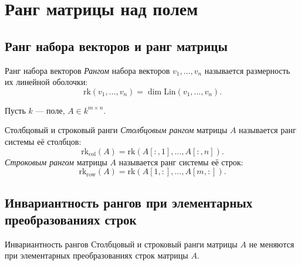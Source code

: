 
\section{Ранг матрицы над полем}

\subsection{Ранг набора векторов и ранг матрицы}

\begin{Definition}{Ранг набора векторов}{}
    \emph{Рангом} набора векторов $v_1, \ldots, v_n$ называется размерность их линейной оболочки:
    \[
        \mathrm{rk}(v_1, \ldots, v_n) = \dim \mathrm{Lin}(v_1, \ldots, v_n).
    \]
\end{Definition}

Пусть $k$ — поле, $A \in k^{m \times n}$.

\begin{Definition}{Столбцовый и строковый ранги}{}
    \emph{Столбцовым рангом} матрицы $A$ называется ранг системы её столбцов:
    \[
        \mathrm{rk}_{\mathrm{col}}(A) = \mathrm{rk}(A[{:},1], \ldots, A[{:},n]).
    \]
    \emph{Строковым рангом} матрицы $A$ называется ранг системы её строк:
    \[
        \mathrm{rk}_{\mathrm{row}}(A) = \mathrm{rk}(A[1,{:}], \ldots, A[m,{:}]).
    \]
\end{Definition}

\subsection{Инвариантность рангов при элементарных преобразованиях строк}

\begin{Statement}{Инвариантность рангов}{}
    Столбцовый и строковый ранги матрицы $A$ не меняются при элементарных преобразованиях строк матрицы $A$.
\end{Statement}

